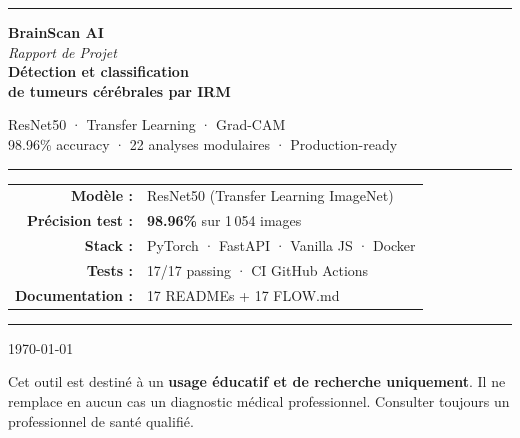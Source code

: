 \documentclass[11pt,a4paper,oneside]{report}
\title{}
\author{}
\date{}
\begin{document}
\begin{titlepage}
\centering
\vspace*{2cm}

{\color{cyan}\rule{\textwidth}{1.5pt}}

\vspace{1.5cm}

{\Huge\bfseries\color{navy} BrainScan AI}\\[0.5cm]
{\Large\color{darkgray}\itshape Rapport de Projet}\\[1cm]

{\LARGE\bfseries\color{navylight} Détection et classification\\ de tumeurs cérébrales par IRM}

\vspace{0.8cm}

{\large\color{darkgray}
ResNet50 · Transfer Learning · Grad-CAM\\
98.96\% accuracy · 22 analyses modulaires · Production-ready
}

\vspace{1.5cm}

{\color{cyan}\rule{0.6\textwidth}{0.8pt}}

\vspace{1cm}

\begin{tabular}{rl}
{\large\bfseries\color{navy} Modèle :} & ResNet50 (Transfer Learning ImageNet) \\
{\large\bfseries\color{navy} Précision test :} & \textbf{\color{accentgreen} 98.96\%} sur 1\,054 images \\
{\large\bfseries\color{navy} Stack :} & PyTorch · FastAPI · Vanilla JS · Docker \\
{\large\bfseries\color{navy} Tests :} & 17/17 passing · CI GitHub Actions \\
{\large\bfseries\color{navy} Documentation :} & 17 READMEs + 17 FLOW.md \\
\end{tabular}

\vfill

{\color{cyan}\rule{\textwidth}{1.5pt}}

\vspace{0.5cm}

{\large\color{darkgray} \today}

\vspace{1cm}

\begin{warningbox}
Cet outil est destiné à un \textbf{usage éducatif et de recherche uniquement}.
Il ne remplace en aucun cas un diagnostic médical professionnel.
Consulter toujours un professionnel de santé qualifié.
\end{warningbox}

\end{titlepage}
\end{document}
